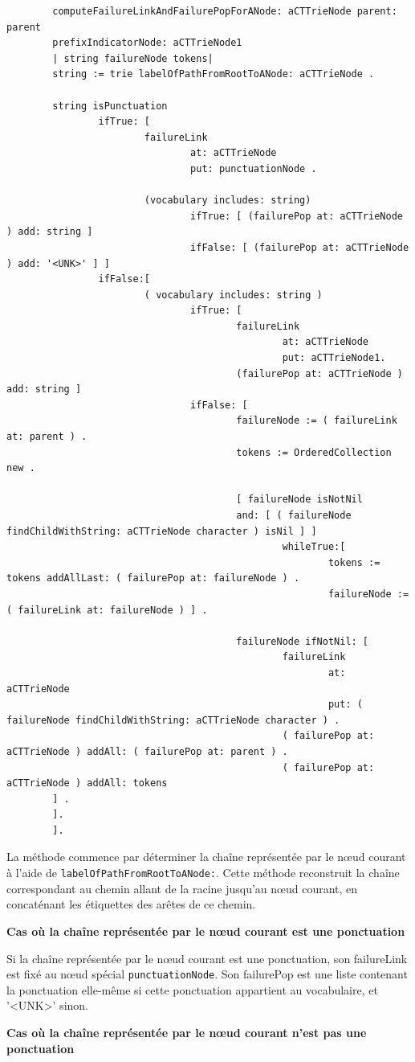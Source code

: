 \documentclass[12pt,a4paper]{report}
\begin{document}
	\begin{verbatim}
		computeFailureLinkAndFailurePopForANode: aCTTrieNode parent: parent
		prefixIndicatorNode: aCTTrieNode1
		| string failureNode tokens|
		string := trie labelOfPathFromRootToANode: aCTTrieNode .
		
		string isPunctuation
				ifTrue: [
						failureLink
								at: aCTTrieNode
								put: punctuationNode .
								
						(vocabulary includes: string)
								ifTrue: [ (failurePop at: aCTTrieNode ) add: string ]
								ifFalse: [ (failurePop at: aCTTrieNode ) add: '<UNK>' ] ]			
				ifFalse:[
						( vocabulary includes: string )
								ifTrue: [
										failureLink
												at: aCTTrieNode
												put: aCTTrieNode1.
										(failurePop at: aCTTrieNode ) add: string ]
								ifFalse: [
										failureNode := ( failureLink at: parent ) .
										tokens := OrderedCollection new .
										
										[ failureNode isNotNil
										and: [ ( failureNode findChildWithString: aCTTrieNode character ) isNil ] ]
												whileTrue:[
														tokens := tokens addAllLast: ( failurePop at: failureNode ) .
														failureNode := ( failureLink at: failureNode ) ] .
														
										failureNode ifNotNil: [
												failureLink
														at: aCTTrieNode
														put: ( failureNode findChildWithString: aCTTrieNode character ) .
												( failurePop at: aCTTrieNode ) addAll: ( failurePop at: parent ) .
												( failurePop at: aCTTrieNode ) addAll: tokens
		] .
		].
		].
	\end{verbatim}
	
	La méthode commence par déterminer la chaîne représentée par le nœud courant à l'aide de \texttt{labelOfPathFromRootToANode:}. Cette méthode reconstruit la chaîne correspondant au chemin allant de la racine jusqu'au nœud courant, en concaténant les étiquettes des arêtes de ce chemin.
	
	\textbf{Cas où la chaîne représentée par le nœud courant est une ponctuation}
	
	Si la chaîne représentée par le nœud courant est une ponctuation, son failureLink est fixé au nœud spécial \texttt{punctuationNode}. Son failurePop est une liste contenant la ponctuation elle-même si cette ponctuation appartient au vocabulaire, et '<UNK>' sinon.
	
	\textbf{Cas où la chaîne représentée par le nœud courant n'est pas une ponctuation}
	
\end{document}
